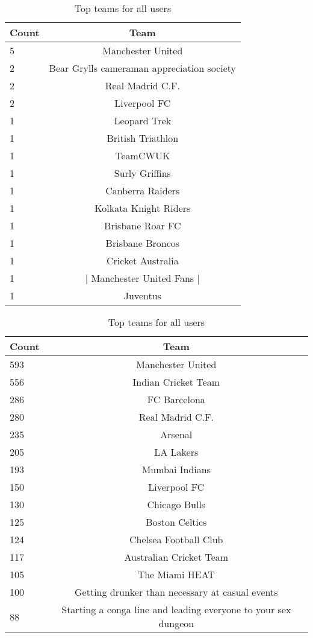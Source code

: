 \begin{table}[h]
\begin{minipage}[b]{.50\textwidth}
\centering
  \begin{tabular}{|l|c|} %
  \hline
  	\textbf{Count} & \textbf{Team} \\ \hline
		5 & Manchester United \\ \hline
		2 & Bear Grylls cameraman appreciation society \\ \hline
		2 & Real Madrid C.F. \\ \hline
		2 & Liverpool FC \\ \hline
		1 & Leopard Trek \\ \hline
		1 & British Triathlon \\ \hline
		1 & TeamCWUK \\ \hline
		1 & Surly Griffins \\ \hline
		1 & Canberra Raiders \\ \hline
		1 & Kolkata Knight Riders \\ \hline
		1 & Brisbane Roar FC \\ \hline
		1 & Brisbane Broncos \\ \hline
		1 & Cricket Australia \\ \hline
		1 & | Manchester United Fans | \\ \hline
		1 & Juventus \\ \hline
  \end{tabular}
  \caption{Top teams for app users}
\end{minipage}
\begin{minipage}[b]{.50\textwidth}
\centering
  \begin{tabular}{|l|c|} %
  \hline
  		\textbf{Count} & \textbf{Team} \\ \hline
		593 & Manchester United \\ \hline
		556 & Indian Cricket Team \\ \hline
		286 & FC Barcelona \\ \hline
		280 & Real Madrid C.F. \\ \hline
		235 & Arsenal \\ \hline
		205 & LA Lakers \\ \hline
		193 & Mumbai Indians \\ \hline
		150 & Liverpool FC \\ \hline
		130 & Chicago Bulls \\ \hline
		125 & Boston Celtics \\ \hline
		124 & Chelsea Football Club \\ \hline
		117 & Australian Cricket Team \\ \hline
		105 & The Miami HEAT \\ \hline
		100 & Getting drunker than necessary at casual events \\ \hline
		88 & Starting a conga line and leading everyone to your sex dungeon \\ \hline
  \end{tabular}
  \caption{Top teams for all users}
\end{minipage}
\end{table}




